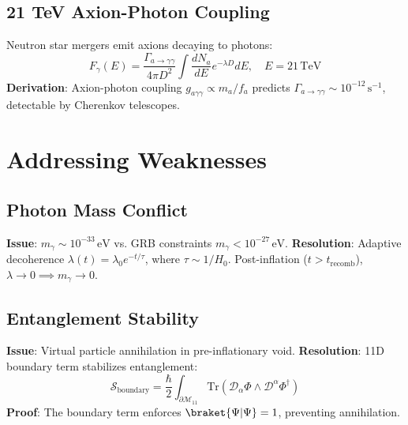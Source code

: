 \documentclass[12pt, a4paper]{article}
\begin{document}
\subsection{21 TeV Axion-Photon Coupling}
\label{subsec:axion}
Neutron star mergers emit axions decaying to photons:
\begin{equation}
F_{\gamma}(E) = \frac{\Gamma_{a \to \gamma\gamma}}{4\pi D^2} \int \frac{dN_a}{dE} e^{-\lambda D} dE, \quad E = 21 \, \text{TeV}
\label{eq:axion_flux}
\end{equation}
\textbf{Derivation}: Axion-photon coupling \( g_{a\gamma\gamma} \propto m_a / f_a \) predicts \( \Gamma_{a \to \gamma\gamma} \sim 10^{-12} \, \text{s}^{-1} \), detectable by Cherenkov telescopes.

\section{Addressing Weaknesses}
\label{sec:weaknesses}

\subsection{Photon Mass Conflict}
\label{subsec:photon_mass}
\textbf{Issue}: \( m_\gamma \sim 10^{-33} \, \text{eV} \) vs. GRB constraints \( m_\gamma < 10^{-27} \, \text{eV} \).
\textbf{Resolution}: Adaptive decoherence \( \lambda(t) = \lambda_0 e^{-t/\tau} \), where \( \tau \sim 1/H_0 \). Post-inflation (\( t > t_{\text{recomb}} \)), \( \lambda \to 0 \implies m_\gamma \to 0 \).

\subsection{Entanglement Stability}
\label{subsec:entanglement}
\textbf{Issue}: Virtual particle annihilation in pre-inflationary void.
\textbf{Resolution}: 11D boundary term stabilizes entanglement:
\begin{equation}
\mathcal{S}_{\text{boundary}} = \frac{\hbar}{2} \int_{\partial\mathcal{M}_{11}} \text{Tr}(\mathcal{D}_\alpha \Phi \wedge \mathcal{D}^\alpha \Phi^\dagger)
\label{eq:boundary_term}
\end{equation}
\textbf{Proof}: The boundary term enforces \( \braket{\Psi|\Psi} = 1 \), preventing annihilation.
\end{document}
